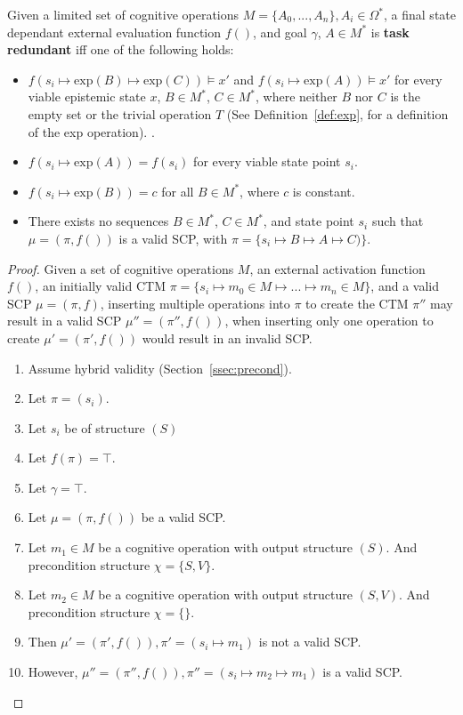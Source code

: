 \begin{definition} \label{lem:taskredundant}
Given a limited set of cognitive operations $M=\{A_0, ..., A_n\}, A_i \in \Omega^*$, a final state dependant external evaluation function  $f()$, and goal $\gamma$, $A \in M^*$ is \textbf{task redundant} iff one of the following holds:
\begin{itemize}
\item $f(s_i \longmapsto \text{exp}(B) \longmapsto \text{exp}(C)) \models x'$ and $f(s_i \longmapsto \text{exp}(A)) \models x'$ for every viable epistemic state $x$, $B \in M^*$, $C \in M^*$, where neither $B$ nor $C$ is the empty set or the trivial operation $T$ (See Definition~\ref{def:exp}, for a definition of the exp operation). . 
\item $f(s_i \longmapsto \text{exp}(A)) = f(s_i)$ for every viable state point $s_i$.
\item $f(s_i \longmapsto \text{exp}(B))=c$ for all $B \in M^*$, where $c$ is constant.
\item There exists no sequences $B \in M^*$, $C \in M^*$, and state point $s_i$ such that $\mu=(\pi,f())$ is a valid SCP, with $\pi=\{s_i \longmapsto B \longmapsto A \longmapsto C)\}$.
\end{itemize}
\end{definition}






\begin{proof} \label{proof:insertionSearch}
Given a set of cognitive operations $M$, an external activation function $f()$, an initially valid CTM $\pi=\{s_i \longmapsto m_0\in M \longmapsto ... \longmapsto m_n\in M\}$, and a valid SCP $\mu=(\pi,f)$, inserting multiple operations into $\pi$ to create the CTM $\pi''$ may result in a valid SCP $\mu''=(\pi'',f())$, when inserting only one operation to create $\mu'=(\pi',f())$ would result in an invalid SCP.

\begin{enumerate}
\item Assume hybrid validity (Section~\ref{ssec:precond}).
\item Let $\pi=(s_i)$.
\item Let $s_i$ be of structure $(S)$
\item Let $f(\pi)=\top$.
\item Let $\gamma = \top$.
\item Let $\mu=(\pi,f())$ be a valid SCP.
\item Let $m_1 \in M$ be a cognitive operation with output structure $(S)$. And precondition structure $\chi=\{S,V\}$.
\item Let $m_2 \in M$ be a cognitive operation with output structure $(S,V)$. And precondition structure $\chi=\{\}$.
\item Then $\mu'=(\pi',f()), \pi'=(s_i \longmapsto m_1)$ is not a valid SCP.
\item However, $\mu''=(\pi'',f()), \pi''=(s_i \longmapsto m_2 \longmapsto m_1)$ is a valid SCP.
\end{enumerate}
\end{proof}








